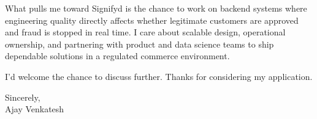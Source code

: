 \documentclass[letterpaper,11pt]{article}
\begin{document}
What pulls me toward Signifyd is the chance to work on backend systems where engineering quality directly affects whether legitimate customers are approved and fraud is stopped in real time. I care about scalable design, operational ownership, and partnering with product and data science teams to ship dependable solutions in a regulated commerce environment.

I'd welcome the chance to discuss further. Thanks for considering my application.

\vspace{12pt}
Sincerely, \\
Ajay Venkatesh
\end{document}
